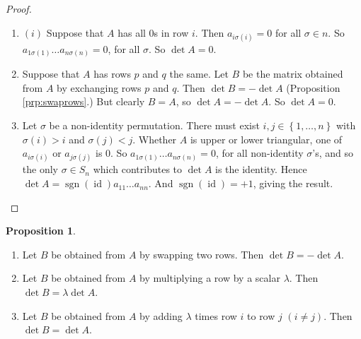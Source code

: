 \documentclass{article}
\theoremstyle{definition} \newtheorem*{definition}{Definition}
\newtheorem{proposition}[theorem]{Proposition}
\DeclareMathOperator{\sgn}{sgn} \DeclareMathOperator{\id}{id}
\begin{document}
    \begin{proof}\hfill \begin{enumerate} \item $(i)$ Suppose that $A$ has all
            0s in row $i$. Then $a_{i\sigma(i)} = 0$ for all $\sigma \in n$.
          So $a_{1\sigma(1)}\dots a_{n\sigma(n)} = 0$, for all $\sigma$. So
        $\det A = 0$.  \item  Suppose that $A$ has rows $p$ and $q$ the same.
          Let $B$ be the matrix obtained from $A$ by exchanging rows $p$ and
          $q$. Then $\det B = -\det A $ (Proposition \ref{prp:swaprows}.) But
          clearly $B = A$, so $\det A = -\det A$. So $\det A = 0$.

     \item Let $\sigma$  be a non-identity permutation. There must exist $i, j
       \in \left\{ 1,\dots ,n \right\}$ with $\sigma(i) > i$ and $\sigma(j) <
       j$. Whether $A$ is upper or lower triangular, one of $a_{i\sigma(i)}$ or
       $a_{j\sigma(j)}$ is 0. So $a_{1\sigma(1)}\dots a_{n\sigma(n)} = 0$, for
       all non-identity $\sigma$’s, and so the only $\sigma \in S_n$ which
       contributes to $\det A$ is the identity. Hence $\det A = \sgn(\id)
       a_{11}\dots a_{nn}$. And $\sgn(\id) = +1$, giving the result.
   \end{enumerate} \end{proof}

\begin{proposition}\hfill \label{prp:rowops} \begin{enumerate} \item Let $B$ be
        obtained from $A$ by swapping two rows. Then $\det B = - \det A$.
      \item Let $B$ be obtained from $A$ by multiplying a row by a scalar
        $\lambda$. Then $\det B = \lambda\det A$.  \item Let $B$ be obtained
          from $A$ by adding $\lambda$ times row $i$ to row $j$ $(i \neq j)$.
          Then $\det B = \det A$.  \end{enumerate} \end{proposition}
\end{document}
